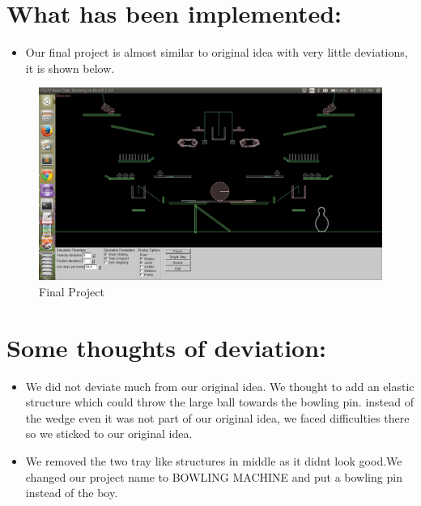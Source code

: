 \documentclass[10pt,a4paper]{article}
\begin{document}
\vspace{-10pt}

\section*{\textbf{What has been implemented:}}
\begin{itemize}[itemsep = -0.75 mm, leftmargin=*]
\item Our final project is almost similar to original idea with very little
deviations, it is shown below.
\end{itemize}

\begin{figure}[!htb]
\begin{center}
\includegraphics[width=1.0\textwidth]{outlinefinal.png}
\end{center}
\caption{Final Project}
\end{figure}

\vspace{-10pt}
\section*{\textbf{Some thoughts of deviation:}}
\begin{itemize}[itemsep = -0.75 mm, leftmargin=*]
\item We did not deviate much from our original idea. We thought to add
an elastic structure which could throw the large ball towards the bowling pin.
instead of the wedge even it was not part of our original idea, we faced
difficulties there so we sticked to our original idea.
\item We removed the two tray like structures in middle as it didnt look good.We
changed our project name to BOWLING MACHINE and put a bowling pin instead of the
boy.
\end{itemize}
\vspace{-10pt}
\end{document}
